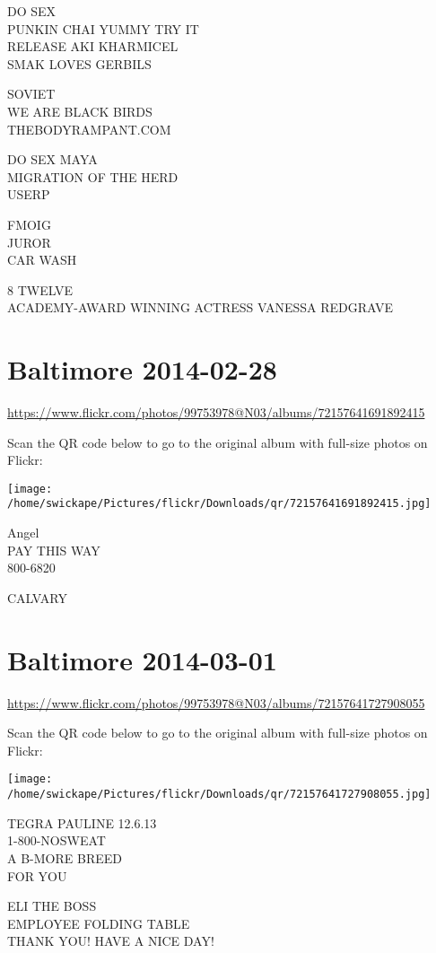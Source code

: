 \documentclass[10pt,letterpaper]{article}
\begin{document}
DO SEX\\
PUNKIN CHAI YUMMY TRY IT\\
RELEASE AKI KHARMICEL\\
SMAK LOVES GERBILS

SOVIET\\
WE ARE BLACK BIRDS\\
THEBODYRAMPANT.COM

DO SEX MAYA\\
MIGRATION OF THE HERD\\
USERP

FMOIG\\
JUROR\\
CAR WASH

8 TWELVE\\
ACADEMY{-}AWARD WINNING ACTRESS VANESSA REDGRAVE


\section*{Baltimore 2014-02-28}

\url{https://www.flickr.com/photos/99753978@N03/albums/72157641691892415}

Scan the QR code below to go to the original album with full-size photos on Flickr:

\texttt{[image: /home/swickape/Pictures/flickr/Downloads/qr/72157641691892415.jpg]}


Angel\\
PAY THIS WAY\\
800{-}6820

CALVARY


\section*{Baltimore 2014-03-01}

\url{https://www.flickr.com/photos/99753978@N03/albums/72157641727908055}

Scan the QR code below to go to the original album with full-size photos on Flickr:

\texttt{[image: /home/swickape/Pictures/flickr/Downloads/qr/72157641727908055.jpg]}


TEGRA PAULINE 12.6.13\\
1{-}800{-}NOSWEAT\\
A B{-}MORE BREED\\
FOR YOU

ELI THE BOSS\\
EMPLOYEE FOLDING TABLE\\
THANK YOU!  HAVE A NICE DAY!
\end{document}
